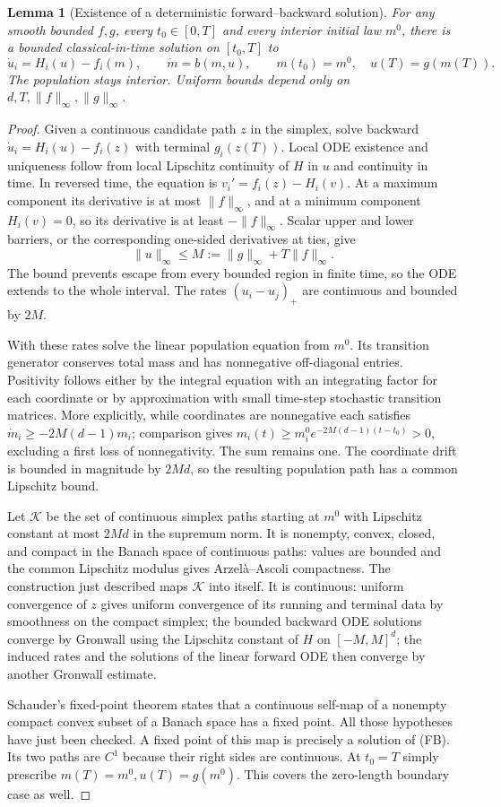 \documentclass[11pt,a4paper]{article}
\newtheorem{lemma}[theorem]{Lemma}
\theoremstyle{definition}
\theoremstyle{remark}
\begin{document}
\begin{lemma}[Existence of a deterministic forward--backward solution]
For any smooth bounded $f,g$, every $t_0\in[0,T]$ and every interior initial law $m^0$, there is a bounded classical-in-time solution on $[t_0,T]$ to
\[
 \dot u_i=H_i(u)-f_i(m),\qquad
 \dot m=b(m,u),\qquad m(t_0)=m^0,\quad u(T)=g(m(T)). \tag{FB}
\]
The population stays interior. Uniform bounds depend only on $d,T,\|f\|_\infty,\|g\|_\infty$.
\end{lemma}
\begin{proof}
Given a continuous candidate path $z$ in the simplex, solve backward
$\dot u_i=H_i(u)-f_i(z)$ with terminal $g_i(z(T))$.
Local ODE existence and uniqueness follow from local Lipschitz continuity of $H$ in $u$ and continuity in time. In reversed time, the equation is $v_i'=f_i(z)-H_i(v)$. At a maximum component its derivative is at most $\|f\|_\infty$, and at a minimum component $H_i(v)=0$, so its derivative is at least $-\|f\|_\infty$. Scalar upper and lower barriers, or the corresponding one-sided derivatives at ties, give
\[
 \|u\|_\infty\leq M:=\|g\|_\infty+T\|f\|_\infty.
\]
The bound prevents escape from every bounded region in finite time, so the ODE extends to the whole interval. The rates $(u_i-u_j)_+$ are continuous and bounded by $2M$.

With these rates solve the linear population equation from $m^0$. Its transition generator conserves total mass and has nonnegative off-diagonal entries. Positivity follows either by the integral equation with an integrating factor for each coordinate or by approximation with small time-step stochastic transition matrices. More explicitly, while coordinates are nonnegative each satisfies $\dot m_i\geq-2M(d-1)m_i$; comparison gives $m_i(t)\geq m_i^0e^{-2M(d-1)(t-t_0)}>0$, excluding a first loss of nonnegativity. The sum remains one. The coordinate drift is bounded in magnitude by $2Md$, so the resulting population path has a common Lipschitz bound.

Let $\mathcal K$ be the set of continuous simplex paths starting at $m^0$ with Lipschitz constant at most $2Md$ in the supremum norm. It is nonempty, convex, closed, and compact in the Banach space of continuous paths: values are bounded and the common Lipschitz modulus gives Arzel\`a--Ascoli compactness. The construction just described maps $\mathcal K$ into itself. It is continuous: uniform convergence of $z$ gives uniform convergence of its running and terminal data by smoothness on the compact simplex; the bounded backward ODE solutions converge by Gronwall using the Lipschitz constant of $H$ on $[-M,M]^d$; the induced rates and the solutions of the linear forward ODE then converge by another Gronwall estimate.

Schauder's fixed-point theorem states that a continuous self-map of a nonempty compact convex subset of a Banach space has a fixed point. All those hypotheses have just been checked. A fixed point of this map is precisely a solution of (FB). Its two paths are $C^1$ because their right sides are continuous. At $t_0=T$ simply prescribe $m(T)=m^0,u(T)=g(m^0)$. This covers the zero-length boundary case as well.
\end{proof}
\end{document}
